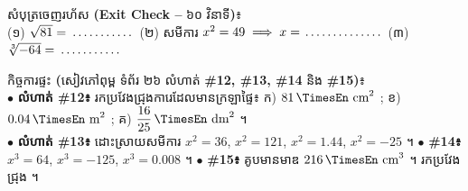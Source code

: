 \documentclass[a4paper,10pt]{article}
\newcommand{\en}[1]{{\TimesEn #1}}
\newcommand{\enbf}[1]{{\TimesEn\bfseries #1}}
\newcommand{\unit}[1]{\,\text{\en{#1}}}
\newcommand{\blank}[1][1.5cm]{\makebox[#1]{\dotfill}}
\begin{document}
\vspace{5pt}
\begin{tcolorbox}[enhanced, sharp corners, colback=white, colframe=black, boxrule=0.85pt, boxsep=2.5pt, top=3.5pt, bottom=3.5pt, left=5pt, right=5pt]
  {\muol\fontsize{8.8pt}{12.5pt}\selectfont សំបុត្រចេញរហ័ស \enbf{(Exit Check --} ៦០ វិនាទី\enbf{)}៖}\\[2pt]
  (១) $\sqrt{81} = \blank[1.8cm]$ \quad \en{|} \quad
  (២) សមីការ $x^2 = 49 \implies x = \blank[2.2cm]$ \quad \en{|} \quad
  (៣) $\sqrt[3]{-64} = \blank[1.8cm]$
\end{tcolorbox}

\vspace{5pt}
\begin{tcolorbox}[enhanced, sharp corners, colback=panelgray, colframe=black, boxrule=0.85pt, boxsep=2.5pt, top=3.5pt, bottom=3.5pt, left=5pt, right=5pt]
  {\muol\fontsize{8.8pt}{12.5pt}\selectfont កិច្ចការផ្ទះ \enbf{(}សៀវភៅពុម្ព ទំព័រ ២៦ លំហាត់ \enbf{\#12, \#13, \#14} និង \enbf{\#15)}៖}\\[2pt]
  $\bullet$ \textbf{លំហាត់ \#12៖} រកប្រវែងជ្រុងការេដែលមានក្រឡាផ្ទៃ៖ ក) $81\unit{cm}^2$ ; ខ) $0.04\unit{m}^2$ ; គ) $\dfrac{16}{25}\unit{dm}^2$ ។\\
  $\bullet$ \textbf{លំហាត់ \#13៖} ដោះស្រាយសមីការ $x^2 = 36$, $x^2 = 121$, $x^2 = 1.44$, $x^2 = -25$ ។ \quad
  $\bullet$ \textbf{\#14៖} $x^3 = 64$, $x^3 = -125$, $x^3 = 0.008$ ។ \quad
  $\bullet$ \textbf{\#15៖} គូបមានមាឌ $216\unit{cm}^3$ ។ រកប្រវែងជ្រុង ។
\end{tcolorbox}
\end{document}

